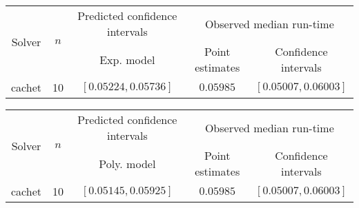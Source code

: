 \begin{tabular}{ccccc}
\hline 
\multirow{2}{*}{Solver} & \multirow{2}{*}{$n$} & Predicted confidence intervals & \multicolumn{2}{c}{Observed median  run-time}\tabularnewline
 &  & Exp. model  & Point estimates  & Confidence intervals\tabularnewline
\hline 
\hline 
\multirow{0}{*}{cachet} & 10 & $\mathbf{\left[0.05224,0.05736\right]}$ & $0.05985$ & $\left[0.05007,0.06003\right]$ \tabularnewline 
\hline 
\end{tabular} 

\begin{tabular}{ccccc}
\hline 
\multirow{2}{*}{Solver} & \multirow{2}{*}{$n$} & Predicted confidence intervals & \multicolumn{2}{c}{Observed median  run-time}\tabularnewline
 &  & Poly. model  & Point estimates  & Confidence intervals\tabularnewline
\hline 
\hline 
\multirow{0}{*}{cachet} & 10 & $\mathbf{\left[0.05145,0.05925\right]}$ & $0.05985$ & $\left[0.05007,0.06003\right]$ \tabularnewline 
\hline 
\end{tabular} 


